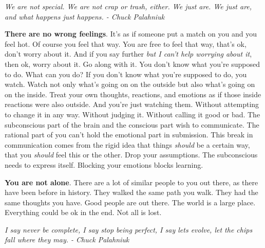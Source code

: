 \documentclass[a4paper,hidelinks]{article}
\begin{document}
\newpage

\begin{center}
\textit{
We are not special. We are not crap or trash, either. We just are. We just are, and what happens just happens. - Chuck Palahniuk
}
\end{center}

\textbf{There are no wrong feelings}.
It's as if someone put a match on you and you feel hot.
Of course you feel that way.
You are free to feel that way, that's ok, don't worry about it.
And if you say further \textit{but I can't help worrying about it}, then ok, worry about it.
Go along with it.
You don't know what you're supposed to do.
What can you do?
If you don't know what you're supposed to do, you watch.
Watch not only what's going on on the outside but also what's going on on the inside.
Treat your own thoughts, reactions, and emotions as if those inside reactions were also outside.
And you're just watching them.
Without attempting to change it in any way.
Without judging it.
Without calling it good or bad.
The subconscious part of the brain and the conscious part wish to communicate.
The rational part of you can't hold the emotional part in submission.
This break in communication comes from the rigid idea that things \textit{should} be a certain way, that you \textit{should} feel this or the other.
Drop your assumptions.
The subconscious needs to express itself.
Blocking your emotions blocks learning.


\newpage

\textbf{You are not alone}.
There are a lot of similar people to you out there, as there have been before in history.
They walked the same path you walk.
They had the same thoughts you have.
Good people are out there.
The world is a large place.
Everything could be ok in the end.
Not all is lost.

\newpage

\begin{center}
\textit{
I say never be complete, I say stop being perfect, I say lets evolve, let the chips fall where they may. - Chuck Palahniuk
}
\end{center}
\end{document}
